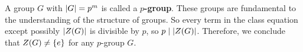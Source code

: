A group $ G $ with $ \abs{G} = p^{m} $ is called a $ p $\textbf{-group}.
These groups are fundamental to the understanding of the structure of groups. \vsp
%
So every term in the class equation except possibly $ \abs{Z(G)} $ is divisible by $ p $,
so $ p \mid \abs{Z(G)} $.
Therefore, we conclude that $ Z(G) \neq \left\{{e}\right\} $ for any $ p $-group $ G $.
